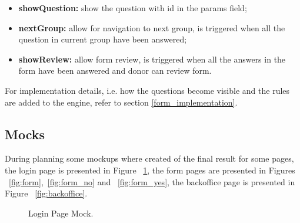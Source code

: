 \begin{itemize}
	\item \textbf{showQuestion:} show the question with id in the params field;
	\item \textbf{nextGroup:} allow for navigation to next group, is triggered when all the question in current group have been answered;
	\item \textbf{showReview:} allow form review, is triggered when all the answers in the form have been answered and donor can review form.
\end{itemize}

For implementation details, i.e. how the questions become visible and the rules are added to the engine, refer to section \ref{form_implementation}.
\newpage


\subsection{Mocks}
During planning some mockups where created of the final result for some pages, the login page is presented in Figure ~\ref{fig:login}, the form pages are presented in Figures ~\ref{fig:form},~\ref{fig:form_no} and ~\ref{fig:form_yes}, the backoffice page is presented in Figure ~\ref{fig:backoffice}.

\begin{figure}[H]
	\begin{center}
	\end{center}
	\caption{Login Page Mock.}\label{fig:login}
\end{figure}


